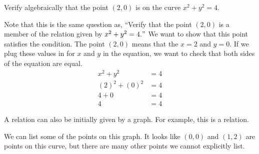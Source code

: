 \documentclass[nooutcomes]{ximera}
\begin{document}
\begin{example} Verify algebraically that the point $(2,0)$ is on the curve $x^2+y^2=4$. 

\begin{explanation}
Note that this is the same question as, ``Verify that the point $(2,0)$ is a member of the relation given by $x^2+y^2=4."$  We want to show that this point satisfies the condition.
The point $(2,0)$ means that the $x=2$ and $y=0$.  If we plug these values in for $x$ and $y$ in the equation, we want to check that both sides of the equation are equal.
\begin{align*}
x^2+y^2&=4 \\
(2)^2+(0)^2&=4 \\
4+0 &= 4 \\
4 &= 4 
\end{align*}
\end{explanation}
\end{example}
\begin{example}
A relation can also be initially given by a graph.  For example, this is a relation.
\begin{image}
\end{image}
\begin{explanation}
We can list some of the points on this graph.  It looks like $(0,0)$ and $(1,2)$ are points on this curve, but there are many other points we cannot explicitly list.
\end{explanation}
\end{example}
\end{document}
